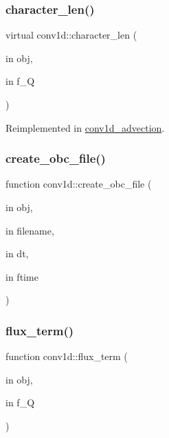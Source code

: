 \subsubsection{\texorpdfstring{character\+\_\+len()}{character\_len()}}
{\footnotesize\ttfamily virtual conv1d\+::character\+\_\+len (\begin{DoxyParamCaption}\item[{in}]{obj,  }\item[{in}]{f\+\_\+Q }\end{DoxyParamCaption})\hspace{0.3cm}{\ttfamily [virtual]}}



Reimplemented in \hyperlink{classconv1d__advection_a9d3767628bcfe2980fc623cf1e07f046}{conv1d\+\_\+advection}.

\mbox{\label{classconv1d_aae2f3637e8e9da279b837720c97bf50c}} 
\subsubsection{\texorpdfstring{create\+\_\+obc\+\_\+file()}{create\_obc\_file()}}
{\footnotesize\ttfamily function conv1d\+::create\+\_\+obc\+\_\+file (\begin{DoxyParamCaption}\item[{in}]{obj,  }\item[{in}]{filename,  }\item[{in}]{dt,  }\item[{in}]{ftime }\end{DoxyParamCaption})}

\mbox{\label{classconv1d_a4834e397bd99e34e3971950506360996}} 
\subsubsection{\texorpdfstring{flux\+\_\+term()}{flux\_term()}}
{\footnotesize\ttfamily function conv1d\+::flux\+\_\+term (\begin{DoxyParamCaption}\item[{in}]{obj,  }\item[{in}]{f\+\_\+Q }\end{DoxyParamCaption})}

